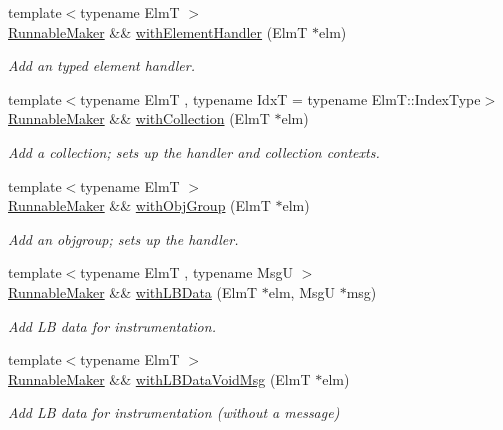 \begin{DoxyCompactItemize}
{\footnotesize template$<$typename ElmT $>$ }\\\hyperlink{structvt_1_1runnable_1_1_runnable_maker}{Runnable\+Maker} \&\& \hyperlink{structvt_1_1runnable_1_1_runnable_maker_a1b37afe7a5ab185c29e85e0d6ebbbc82}{with\+Element\+Handler} (ElmT $\ast$elm)
\begin{DoxyCompactList}\small\item\em Add an typed element handler. \end{DoxyCompactList}\item 
{\footnotesize template$<$typename ElmT , typename IdxT  = typename Elm\+T\+::\+Index\+Type$>$ }\\\hyperlink{structvt_1_1runnable_1_1_runnable_maker}{Runnable\+Maker} \&\& \hyperlink{structvt_1_1runnable_1_1_runnable_maker_aed99a9b0607da59ab7ad7ee56255fcc8}{with\+Collection} (ElmT $\ast$elm)
\begin{DoxyCompactList}\small\item\em Add a collection; sets up the handler and collection contexts. \end{DoxyCompactList}\item 
{\footnotesize template$<$typename ElmT $>$ }\\\hyperlink{structvt_1_1runnable_1_1_runnable_maker}{Runnable\+Maker} \&\& \hyperlink{structvt_1_1runnable_1_1_runnable_maker_acc0749541ac045169d28e5748dc7d1ed}{with\+Obj\+Group} (ElmT $\ast$elm)
\begin{DoxyCompactList}\small\item\em Add an objgroup; sets up the handler. \end{DoxyCompactList}\item 
{\footnotesize template$<$typename ElmT , typename MsgU $>$ }\\\hyperlink{structvt_1_1runnable_1_1_runnable_maker}{Runnable\+Maker} \&\& \hyperlink{structvt_1_1runnable_1_1_runnable_maker_a191c03660b94c5b49b929c92d9608604}{with\+L\+B\+Data} (ElmT $\ast$elm, MsgU $\ast$msg)
\begin{DoxyCompactList}\small\item\em Add LB data for instrumentation. \end{DoxyCompactList}\item 
{\footnotesize template$<$typename ElmT $>$ }\\\hyperlink{structvt_1_1runnable_1_1_runnable_maker}{Runnable\+Maker} \&\& \hyperlink{structvt_1_1runnable_1_1_runnable_maker_a42a6e2d7b273b6bb61d6659c2651d3c5}{with\+L\+B\+Data\+Void\+Msg} (ElmT $\ast$elm)
\begin{DoxyCompactList}\small\item\em Add LB data for instrumentation (without a message) \end{DoxyCompactList}\item 

\end{DoxyCompactItemize}
